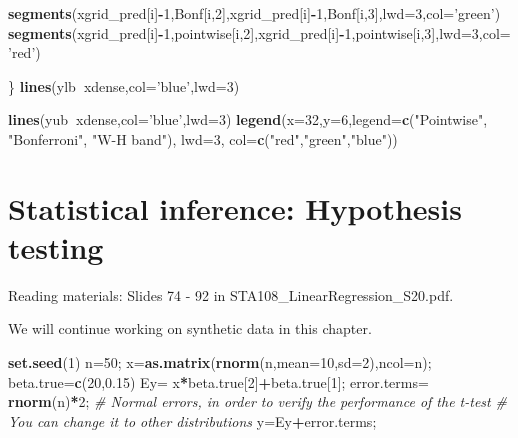 \documentclass[12pt,]{book}
\newenvironment{Shaded}{\begin{snugshade}}{\end{snugshade}}
\newcommand{\KeywordTok}[1]{\textcolor[rgb]{0.13,0.29,0.53}{\textbf{#1}}}
\newcommand{\DataTypeTok}[1]{\textcolor[rgb]{0.13,0.29,0.53}{#1}}
\newcommand{\DecValTok}[1]{\textcolor[rgb]{0.00,0.00,0.81}{#1}}
\newcommand{\FloatTok}[1]{\textcolor[rgb]{0.00,0.00,0.81}{#1}}
\newcommand{\StringTok}[1]{\textcolor[rgb]{0.31,0.60,0.02}{#1}}
\newcommand{\CommentTok}[1]{\textcolor[rgb]{0.56,0.35,0.01}{\textit{#1}}}
\newcommand{\OperatorTok}[1]{\textcolor[rgb]{0.81,0.36,0.00}{\textbf{#1}}}
\newcommand{\NormalTok}[1]{#1}
\begin{document}
\begin{Shaded}
\begin{Highlighting}[]
\KeywordTok{segments}\NormalTok{(xgrid_pred[i]}\OperatorTok{-}\DecValTok{1}\NormalTok{,Bonf[i,}\DecValTok{2}\NormalTok{],xgrid_pred[i]}\OperatorTok{-}\DecValTok{1}\NormalTok{,Bonf[i,}\DecValTok{3}\NormalTok{],}\DataTypeTok{lwd=}\DecValTok{3}\NormalTok{,}\DataTypeTok{col=}\StringTok{'green'}\NormalTok{)}
\KeywordTok{segments}\NormalTok{(xgrid_pred[i]}\OperatorTok{-}\DecValTok{1}\NormalTok{,pointwise[i,}\DecValTok{2}\NormalTok{],xgrid_pred[i]}\OperatorTok{-}\DecValTok{1}\NormalTok{,pointwise[i,}\DecValTok{3}\NormalTok{],}\DataTypeTok{lwd=}\DecValTok{3}\NormalTok{,}\DataTypeTok{col=}\StringTok{'red'}\NormalTok{)}

\NormalTok{\}}
\KeywordTok{lines}\NormalTok{(ylb}\OperatorTok{~}\NormalTok{xdense,}\DataTypeTok{col=}\StringTok{'blue'}\NormalTok{,}\DataTypeTok{lwd=}\DecValTok{3}\NormalTok{)}

\KeywordTok{lines}\NormalTok{(yub}\OperatorTok{~}\NormalTok{xdense,}\DataTypeTok{col=}\StringTok{'blue'}\NormalTok{,}\DataTypeTok{lwd=}\DecValTok{3}\NormalTok{)}
\KeywordTok{legend}\NormalTok{(}\DataTypeTok{x=}\DecValTok{32}\NormalTok{,}\DataTypeTok{y=}\DecValTok{6}\NormalTok{,}\DataTypeTok{legend=}\KeywordTok{c}\NormalTok{(}\StringTok{"Pointwise"}\NormalTok{, }\StringTok{"Bonferroni"}\NormalTok{, }\StringTok{"W-H band"}\NormalTok{), }\DataTypeTok{lwd=}\DecValTok{3}\NormalTok{, }\DataTypeTok{col=}\KeywordTok{c}\NormalTok{(}\StringTok{"red"}\NormalTok{,}\StringTok{"green"}\NormalTok{,}\StringTok{"blue"}\NormalTok{))}
\end{Highlighting}
\end{Shaded}

\chapter{Statistical inference: Hypothesis testing}\label{ch:test}

Reading materials: Slides 74 - 92 in STA108\_LinearRegression\_S20.pdf.

We will continue working on synthetic data in this chapter.

\begin{Shaded}
\begin{Highlighting}[]
\KeywordTok{set.seed}\NormalTok{(}\DecValTok{1}\NormalTok{)}
\NormalTok{n=}\DecValTok{50}\NormalTok{;}
\NormalTok{x=}\KeywordTok{as.matrix}\NormalTok{(}\KeywordTok{rnorm}\NormalTok{(n,}\DataTypeTok{mean=}\DecValTok{10}\NormalTok{,}\DataTypeTok{sd=}\DecValTok{2}\NormalTok{),}\DataTypeTok{ncol=}\NormalTok{n);}
\NormalTok{beta.true=}\KeywordTok{c}\NormalTok{(}\DecValTok{20}\NormalTok{,}\FloatTok{0.15}\NormalTok{)}
\NormalTok{Ey=}\StringTok{ }\NormalTok{x}\OperatorTok{*}\NormalTok{beta.true[}\DecValTok{2}\NormalTok{]}\OperatorTok{+}\NormalTok{beta.true[}\DecValTok{1}\NormalTok{];}
\NormalTok{error.terms=}\StringTok{ }\KeywordTok{rnorm}\NormalTok{(n)}\OperatorTok{*}\DecValTok{2}\NormalTok{; }\CommentTok{# Normal errors, in order to verify the performance of the t-test }
\CommentTok{# You can change it to other distributions }
\NormalTok{y=Ey}\OperatorTok{+}\NormalTok{error.terms;}
\end{Highlighting}
\end{Shaded}
\end{document}
